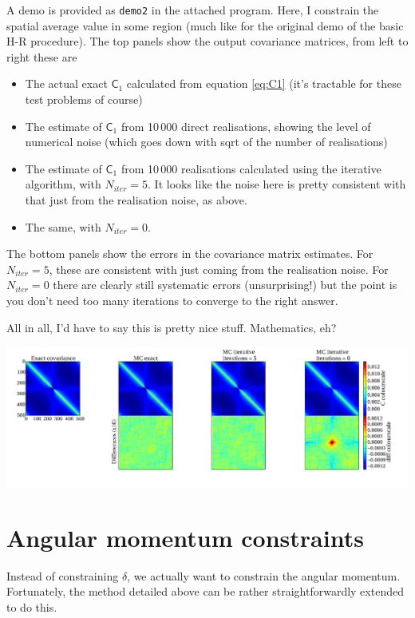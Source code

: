 \documentclass[11pt,a4paper,preprint]{aastex}
\begin{document}
A demo is provided as {\tt demo2} in the attached program. Here, I
constrain the spatial average value in some region (much like for the
original demo of the basic H-R procedure). The top panels show the
output covariance matrices, from left to right these are
\begin{itemize}
\item The actual exact $\mathsf{C}_1$ calculated from equation
  \eqref{eq:C1} (it's tractable for these test problems of course)
\item The estimate of $\mathsf{C}_1$ from 10\,000 direct realisations,
  showing the level of numerical noise (which goes down with sqrt of
  the number of realisations)
\item The estimate of $\mathsf{C}_1$ from 10\,000 realisations
  calculated using the iterative algorithm, with $N_{iter}=5$. It
  looks like the noise here is pretty consistent with that just from
  the realisation noise, as above.
\item The same, with $N_{iter}=0$. 
\end{itemize}

The bottom panels show the errors in the covariance matrix
estimates. For $N_{iter}=5$, these are consistent with just coming
from the realisation noise. For $N_{iter}=0$ there are clearly still
systematic errors (unsurprising!) but the point is you don't need too
many iterations to converge to the right answer.

All in all, I'd have to say this is pretty nice stuff. Mathematics, eh?

\begin{center}
\includegraphics[width=1.1\textwidth]{HR-approx-demo.pdf}
\end{center}

\section{Angular momentum constraints}
\label{sec:AM}

Instead of constraining $\delta$, we actually want to constrain the angular momentum. Fortunately, the method detailed above can be rather straightforwardly extended to do this. 
\end{document}
